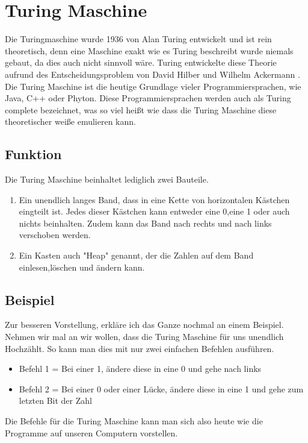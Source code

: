 \section{Turing Maschine}
Die Turingmaschine wurde 1936 von Alan Turing entwickelt und ist rein theoretisch, denn eine Maschine exakt wie es Turing beschreibt wurde niemals gebaut, da dies auch nicht sinnvoll wäre. Turing entwickelte diese Theorie aufrund des Entscheidungsproblem von David Hilber und Wilhelm Ackermann \cite{theessentialturing}. Die Turing Maschine ist die heutige Grundlage vieler Programmiersprachen, wie Java, C++ oder Phyton. Diese Programmiersprachen werden auch als Turing complete bezeichnet, was so viel heißt wie dass die Turing Maschine diese theoretischer weiße emulieren kann.

\subsection{Funktion} 
Die Turing Maschine beinhaltet lediglich zwei Bauteile.
\begin{enumerate}
\item  Ein unendlich langes Band, dass in eine Kette von horizontalen Kästchen eingteilt ist. Jedes dieser Kästchen kann entweder eine 0,eine 1 oder auch nichts beinhalten. Zudem kann das Band nach rechts und nach links verschoben werden.
\item Ein Kasten auch "Heap" genannt, der die Zahlen auf dem Band einlesen,löschen und ändern kann.
\end{enumerate}
 





\subsection{Beispiel} Zur besseren Vorstellung, erkläre ich das Ganze nochmal an einem Beispiel. Nehmen wir mal an wir wollen, dass die Turing Maschine für uns unendlich Hochzählt. So kann man dies mit nur zwei einfachen Befehlen ausführen. 

\begin{itemize}
\item Befehl 1 = Bei einer 1, ändere diese in eine 0 und gehe nach links 
\item Befehl 2 = Bei einer 0 oder einer Lücke, ändere diese in eine 1 und gehe zum letzten Bit der Zahl 
\end{itemize}

Die Befehle für die Turing Maschine kann man sich also heute wie die Programme auf unseren Computern vorstellen.